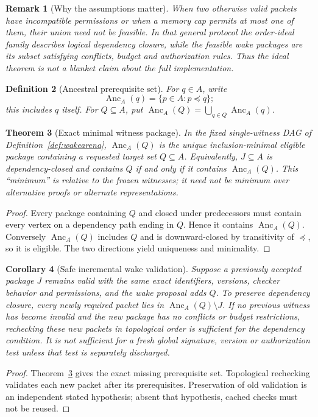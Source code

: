 \documentclass[11pt,letterpaper]{article}
\newtheorem{theorem}{Theorem}[section]
\newtheorem{corollary}[theorem]{Corollary}
\newtheorem{definition}[theorem]{Definition}
\newtheorem{remark}[theorem]{Remark}
\newcommand{\Anc}{\operatorname{Anc}}
\begin{document}
\begin{remark}[Why the assumptions matter]
When two otherwise valid packets have incompatible permissions or when a memory cap permits at most one of them, their union need not be feasible. In that general protocol the order-ideal family describes \emph{logical dependency closure}, while the feasible wake packages are its subset satisfying conflicts, budget and authorization rules. Thus the ideal theorem is not a blanket claim about the full implementation.
\end{remark}

\begin{definition}[Ancestral prerequisite set]
For $q\in A$, write
\[
\Anc_A(q)=\{p\in A:p\preceq q\};
\]
this includes $q$ itself. For $Q\subseteq A$, put $\Anc_A(Q)=\bigcup_{q\in Q}\Anc_A(q)$.
\end{definition}
\begin{theorem}[Exact minimal witness package]\label{thm:minpackage}
In the fixed single-witness DAG of Definition~\ref{def:wakearena}, $\Anc_A(Q)$ is the unique inclusion-minimal eligible package containing a requested target set $Q\subseteq A$. Equivalently, $J\subseteq A$ is dependency-closed and contains $Q$ if and only if it contains $\Anc_A(Q)$. This ``minimum'' is \emph{relative to the frozen witnesses}; it need not be minimum over alternative proofs or alternate representations.
\end{theorem}
\begin{proof}
Every package containing $Q$ and closed under predecessors must contain every vertex on a dependency path ending in $Q$. Hence it contains $\Anc_A(Q)$. Conversely $\Anc_A(Q)$ includes $Q$ and is downward-closed by transitivity of $\preceq$, so it is eligible. The two directions yield uniqueness and minimality.
\end{proof}
\begin{corollary}[Safe incremental wake validation]\label{cor:incremental}
Suppose a previously accepted package $J$ remains valid with the same exact identifiers, versions, checker behavior and permissions, and the wake proposal adds $Q$. To preserve dependency closure, every \emph{newly required} packet lies in $\Anc_A(Q)\setminus J$. If no previous witness has become invalid and the new package has no conflicts or budget restrictions, rechecking these new packets in topological order is sufficient for the \emph{dependency condition}. It is not sufficient for a fresh global signature, version or authorization test unless that test is separately discharged.
\end{corollary}
\begin{proof}
Theorem~\ref{thm:minpackage} gives the exact missing prerequisite set. Topological rechecking validates each new packet after its prerequisites. Preservation of old validation is an independent stated hypothesis; absent that hypothesis, cached checks must not be reused.
\end{proof}
\end{document}
